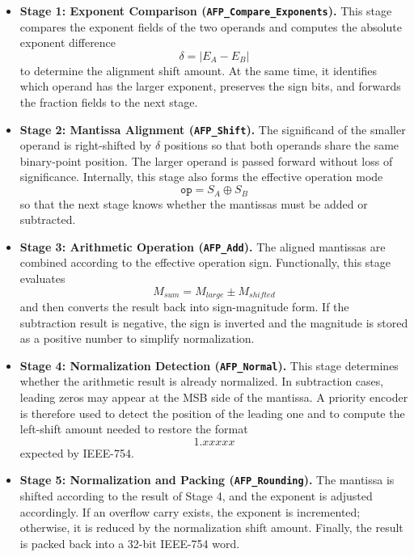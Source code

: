 \begin{itemize}
    \item \textbf{Stage 1: Exponent Comparison (\texttt{AFP\_Compare\_Exponents}).} This stage compares the exponent fields of the two operands and computes the absolute exponent difference
    \begin{equation}
        \delta = |E_A - E_B|
    \end{equation}
    to determine the alignment shift amount. At the same time, it identifies which operand has the larger exponent, preserves the sign bits, and forwards the fraction fields to the next stage.

    \item \textbf{Stage 2: Mantissa Alignment (\texttt{AFP\_Shift}).} The significand of the smaller operand is right-shifted by $\delta$ positions so that both operands share the same binary-point position. The larger operand is passed forward without loss of significance. Internally, this stage also forms the effective operation mode
    \begin{equation}
        \texttt{op} = S_A \oplus S_B
    \end{equation}
    so that the next stage knows whether the mantissas must be added or subtracted.

    \item \textbf{Stage 3: Arithmetic Operation (\texttt{AFP\_Add}).} The aligned mantissas are combined according to the effective operation sign. Functionally, this stage evaluates
    \begin{equation}
        M_{sum} = M_{large} \pm M_{shifted}
    \end{equation}
    and then converts the result back into sign-magnitude form. If the subtraction result is negative, the sign is inverted and the magnitude is stored as a positive number to simplify normalization.

    \item \textbf{Stage 4: Normalization Detection (\texttt{AFP\_Normal}).} This stage determines whether the arithmetic result is already normalized. In subtraction cases, leading zeros may appear at the MSB side of the mantissa. A priority encoder is therefore used to detect the position of the leading one and to compute the left-shift amount needed to restore the format
    \begin{equation}
        1.xxxxx
    \end{equation}
    expected by IEEE-754.

    \item \textbf{Stage 5: Normalization and Packing (\texttt{AFP\_Rounding}).} The mantissa is shifted according to the result of Stage 4, and the exponent is adjusted accordingly. If an overflow carry exists, the exponent is incremented; otherwise, it is reduced by the normalization shift amount. Finally, the result is packed back into a 32-bit IEEE-754 word.
\end{itemize}

